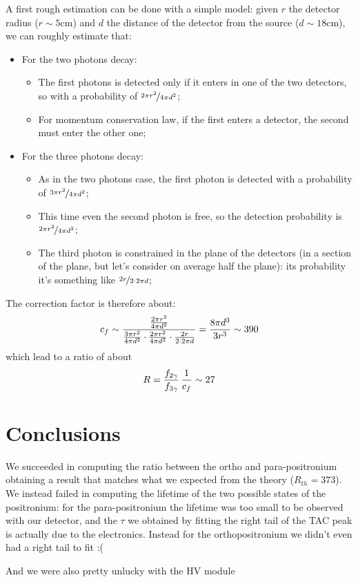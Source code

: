 \documentclass[11pt,a4 paper]{article}
\let\oldfrac\frac
\renewcommand{\frac}[3][d]{\ifthenelse{\equal{#1}{d}}{\oldfrac{#2}{#3}}{\nicefrac{#2}{#3}}}
\begin{document}
A first rough estimation can be done with a simple model: given $r$ the detector radius ($r\sim5\si{\centi\meter}$) and $d$ the distance of the detector from the source ($d\sim18\si{\centi\meter}$), we can roughly estimate that:
\begin{itemize}
    \item For the two photons decay:
    \begin{itemize}
        \item The first photons is detected only if it enters in one of the two detectors, so with a probability of $\frac[f]{2\pi r^2}{4\pi d^2}$;
        \item For momentum conservation law, if the first enters a detector, the second must enter the other one;
    \end{itemize}
    \item For the three photons decay:
    \begin{itemize}
        \item As in the two photons case, the first photon is detected with a probability of $\frac[f]{3 \pi r^2}{4\pi d^2}$;
        \item This time even the second photon is free, so the detection probability is $\frac[f]{2 \pi r^2}{4\pi d^2}$;
        \item The third photon is constrained in the plane of the detectors (in a section of the plane, but let's consider on average half the plane): its probability it's something like  $\frac[f]{2r}{2\cdot2\pi d}$;
    \end{itemize}
\end{itemize}
The correction factor is therefore about:
    \begin{equation}
        c_f \sim \frac{\frac{2 \pi r^2}{4\pi d^2}}{\frac{3 \pi r^2}{4\pi d^2}\cdot\frac{2 \pi r^2}{4\pi d^2}\cdot \frac{2r}{2\cdot2\pi d}} = \frac{8\pi d^3}{3r^3} \sim 390
    \end{equation}
which lead to a ratio of about
\begin{equation}
    R = \frac{f_{2\gamma}}{f_{3\gamma}} \,\frac{1}{c_f} \sim 27
\end{equation}



\section{Conclusions}

We succeeded in computing the ratio between the ortho and para-positronium obtaining a result that matches what we expected from the theory ($R_{th}=373$).
We instead failed in computing the lifetime of the two possible states of the positronium:
for the para-positronium the lifetime was too small to be observed with our detector, and the $\tau$ we obtained by fitting the right tail of the TAC peak is actually due to the electronics.
Instead for the orthopositronium we didn't even had a right tail to fit :(

And we were also pretty unlucky with the HV module
\end{document}
